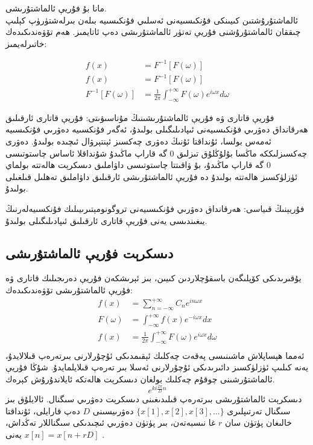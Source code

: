 مانا بۇ فۇريې ئالماشتۇرىشى.\\
ئالماشتۇرۇشتىن كىيىنكى فۇنكىسىيەنى ئەسلىي فۇنكىسىيە بىلەن بىرلەشتۈرۈپ كېلىپ چىققان ئالماشتۇرۇشنى فۇريې تەتۈر ئالماشتۇرىشى دەپ ئاتايمىز.  ھەم تۆۋەندىكىدەك خاتىرلەيمىز:

\begin{align*}
f(x) &= F^{-1}[F(\omega)] \\
f(x) &= F^{-1}[F(\omega)] \\
F^{-1}[F(\omega)] &= \frac{1}{2 \pi} \int_{-\infty}^{+\infty}F(\omega)e^{i \omega x}d\omega
\end{align*}

فۇريې قاتارى ۋە فۇريې ئالماشتۇرىشىنىڭ مۇناسىۋىتى: فۇريې قاتارى ئارقىلىق ھەرقانداق دەۋرىي فۇنكىسىيەنى ئىپادىلىگىلى بولىدۇ، ئەگەر فۇنكسىيە دەۋرىي فۇنكىسىيە ئەمەس بولسا، ئۇنداقتا ئۇنىڭ دەۋرى چەكسىز ئېنتېرۋال ئىچىدە بولىدۇ. دەۋرى چەكسىزلىككە ماڭسا بۇلۇڭلۇق تىزلىق 0 گە قاراپ ماڭىدۇ شۇنداقلا ئاساس چاستوتىسى 0 گە قاراپ ماڭىدۇ، بۇ ۋاقىتتا چاستوتىسى داۋاملىق دىسكرېت ھالەتتە بولماي ئۈزلۈكسىز ھالەتتە بولىدۇ دە فۇريې ئالماشتۇرىشى ئارقىلىق داۋاملىق تەھلىل قىلغىلى بولىدۇ.

\begin{colorful}[red]
فۇريېنىڭ قىياسى: ھەرقانداق دەۋرىي فۇنكىسىيەنى تروگونومېتىرىيىلىك فۇنكسىيەلەرنىڭ يىغىندىسى يەنى فۇريې قاتارى ئارقىلىق ئىپادىلىگىلى بولىدۇ.
\end{colorful}

\subsection{دىسكرېت فۇريې ئالماشتۇرىشى}
يۇقىرىدىكى كۆپلىگەن باسقۇچلاردىن كىيىن، بىز ئېرىشكەن فۇريې دەرىجىلىك قاتارى ۋە فۇريې ئالماشتۇرىشى تۆۋەندىكىدەك:
\begin{align*}
f(x) &= \sum_{n=-\infty}^{+\infty}C_n e^{in \omega x} \\
F(\omega) &= \int_{-\infty}^{+\infty} f(x)e^{-i\omega x}dx \\
f(x) &= \frac{1}{2 \pi} \int_{-\infty}^{+\infty}F(\omega)e^{i \omega x}d\omega\\
\end{align*}
ئەمما ھېساپلاش ماشىنىسى پەقەت چەكلىك ئېقىمدىكى ئۇچۇرلارنى بىرتەرەپ قىلالايدۇ، يەنە كىلىپ ئۈزلۈكسىز دائىرىدىكى ئۇچۇرلارنى ئەسلا بىر تەرەپ قىلايلمايدۇ. شۇڭا فۇريې ئالماشتۇرشىنى چوقۇم چەكلىك بولغان دىسكرېت ھالەتكە ئايلاندۇرۇش كېرەك.
$$e^{ki \frac{2 \pi}{D} n}$$
دىسكرېت ئالماشتۇرىشى بىرتەرەپ قىلىدىغىنى دىسكرېت دەۋرىي سىگنال. ئالايلۇق بىز سىگنال تەرتىپلىرى $\{ x[1],x[2],x[3],... \}$ دەۋرىيسىنى $D$ دەپ قارايلى، ئۇنداقتا خالىغان پۈتۈن سان $r$ غا نىسبەتەن، بىر پۈتۈن دەۋرىي ئىچىدىكى سىگناللار تەڭداش، يەنى $x[n] = x[n+rD]$ .

